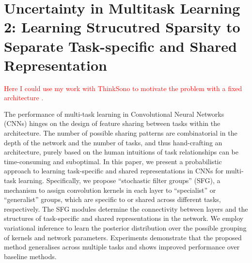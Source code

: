 %
%
%
%
%
%
%
%
\chapter{Uncertainty in Multitask Learning 2: Learning Strucutred Sparsity to Separate Task-specific and Shared Representation} \label{chapter:multitaskuncertainty_part2}

\textcolor{red}{Here I could use my work with ThinkSono to motivate the problem with a fixed architecture \cite{tanno2018autodvt}.}

The performance of multi-task learning in Convolutional Neural Networks (CNNs) hinges on the design of feature sharing between tasks within the architecture. The number of possible sharing patterns are combinatorial in the depth of the network and the number of tasks, and thus hand-crafting an architecture, purely based on the human intuitions of task relationships can be time-consuming and suboptimal. In this paper, we present a probabilistic approach to learning task-specific and shared representations in CNNs for multi-task learning. Specifically, we propose ``stochastic filter groups'' (SFG), a mechanism to assign convolution kernels in each layer to ``specialist'' or ``generalist'' groups, which are specific to or shared across different tasks, respectively. The SFG modules determine the connectivity between layers and the structures of task-specific and shared representations in the network. We employ variational inference to learn the posterior distribution over the possible grouping of kernels and network parameters. Experiments demonstrate that the proposed method generalises across multiple tasks and shows improved performance over baseline methods. 

